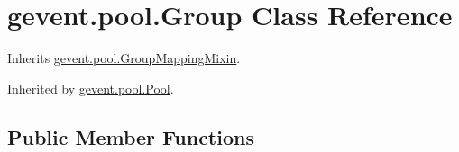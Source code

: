 \hypertarget{classgevent_1_1pool_1_1_group}{}\section{gevent.\+pool.\+Group Class Reference}
\label{classgevent_1_1pool_1_1_group}


Inherits \hyperlink{classgevent_1_1pool_1_1_group_mapping_mixin}{gevent.\+pool.\+Group\+Mapping\+Mixin}.



Inherited by \hyperlink{classgevent_1_1pool_1_1_pool}{gevent.\+pool.\+Pool}.

\subsection*{Public Member Functions}
